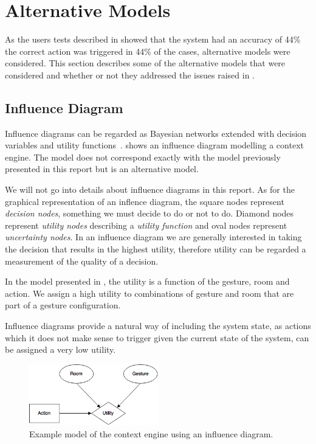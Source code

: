 \section{Alternative Models}
\label{sec:evaluation:alternative-models}

As the users tests described in  showed that the system had an accuracy of 44\% \ie the correct action was triggered in 44\% of the cases, alternative models were considered. This section describes some of the alternative models that were considered and whether or not they addressed the issues raised in .

\subsection{Influence Diagram}

Influence diagrams can be regarded as Bayesian networks extended with decision variables and utility functions~\cite{kjaerulff2008bayesian}.  shows an influence diagram modelling a context engine. The model does not correspond exactly with the model previously presented in this report but is an alternative model.

We will not go into details about influence diagrams in this report. As for the graphical representation of an inflence diagram, the square nodes represent \emph{decision nodes}, \ie something we must decide to do or not to do. Diamond nodes represent \emph{utility nodes} describing a \emph{utility function} and oval nodes represent \emph{uncertainty nodes}. In an influence diagram we are generally interested in taking the decision that results in the highest utility, therefore utility can be regarded a measurement of the quality of a decision.

In the model presented in , the utility is a function of the gesture, room and action. We assign a high utility to combinations of gesture and room that are part of a gesture configuration. 

Influence diagrams provide a natural way of including the system state, as actions which it does not make sense to trigger given the current state of the system, can be assigned a very low utility.

\begin{figure}[!h]
\centering
\includegraphics[width=0.50\textwidth]{images/influence-diagram}
\caption{Example model of the context engine using an influence diagram.}
\label{fig:evaluation:alternative-models:influence-diagram}
\end{figure}

